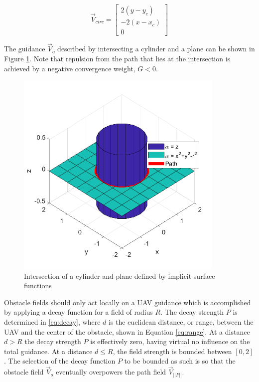 \documentclass[numbered,pdftex]{ohio-etd}
\begin{document}
\begin{equation}
\label{eq:vcirc_circle}
\overrightarrow{V}_{circ} =  \begin{bmatrix}  2(y-y_c) \\[6pt] -2(x-x_c) \\[6pt] 0\end{bmatrix}
\end{equation}

The guidance $\overrightarrow{V}_o$ described by intersecting a cylinder and a plane can be shown in Figure \ref{fig:cylinderIntersection}. Note that repulsion from the path that lies at the intersection is achieved by a negative convergence weight, $G<0$.

\begin{figure}[H]
	\centering
	\includegraphics[width=10cm]{Figures/cylinderIntersection}
	\caption{Intersection of a cylinder and plane defined by implicit surface functions}
	\label{fig:cylinderIntersection}
\end{figure}

Obstacle fields should only act locally on a UAV guidance which is accomplished by applying a decay function for a field of radius $R$. The decay strength $P$ is determined in \ref{eq:decay}, where $d$ is the euclidean distance, or range, between the UAV and the center of the obstacle, shown in Equation \ref{eq:range}. At a distance $d>R$ the decay strength $P$ is effectively zero, having virtual no influence on the total guidance. At a distance $d\leq R$, the field strength is bounded between $[0,2]$. The selection of the decay function $P$ to be bounded as such is so that the obstacle field $\overrightarrow{V}_o$ eventually overpowers the path field $\overrightarrow{V}_{||P||}$. 
\end{document}
